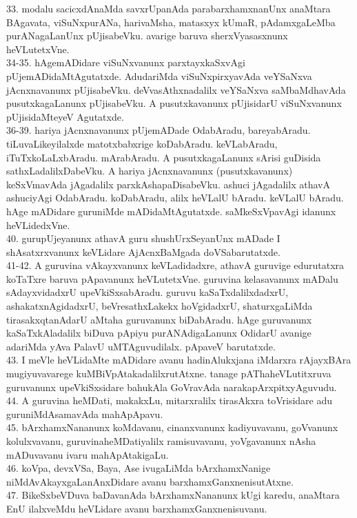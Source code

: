 \documentclass{article}
\begin{document}
33. modalu sacicxdAnaMda savxrUpanAda parabarxhamxnanUnx anaMtara BAgavata, viSuNxpurANa, harivaMsha, matasxyx kUmaR, pAdamxgaLeMba purANagaLanUnx pUjisabeVku. avarige baruva sherxVyasasxnunx heVLutetxVne.\\
34-35. hAgemADidare viSuNxvanunx parxtayxkaSxvAgi pUjemADidaMtAgutatxde. AdudariMda viSuNxpirxyavAda veYSaNxva jAcnxnavanunx pUjisabeVku. deVvasAthxnadalilx veYSaNxva saMbaMdhavAda pusutxkagaLanunx pUjisabeVku. A pusutxkavanunx pUjisidarU viSuNxvanunx pUjisidaMteyeV Agutatxde.\\
36-39. hariya jAcnxnavanunx pUjemADade OdabAradu, bareyabAradu. tiLuvaLikeyilalxde matotxbabxrige koDabAradu. keVLabAradu, iTuTxkoLaLxbAradu. mArabAradu. A pusutxkagaLanunx sArisi guDisida sathxLadalilxDabeVku. A hariya jAcnxnavanunx (pusutxkavanunx) keSxVmavAda jAgadalilx parxkAshapaDisabeVku. ashuci jAgadalilx athavA ashuciyAgi OdabAradu. koDabAradu, alilx heVLalU bAradu. keVLalU bAradu. hAge mADidare guruniMde mADidaMtAgutatxde. saMkeSxVpavAgi idanunx heVLidedxVne.\\
40. gurupUjeyanunx athavA guru shushUrxSeyanUnx mADade I shAsatxrxvanunx keVLidare AjAcnxBaMgada doVSabarutatxde.\\
41-42. A guruvina vAkayxvanunx keVLadidadxre, athavA guruvige edurutatxra koTaTxre baruva pApavanunx heVLutetxVne. guruvina kelasavanunx mADalu sAdayxvidadxrU upeVkiSxsabAradu. guruvu kaSaTxdalilxdadxrU, ashakatxnAgidadxrU, beVresathxLakekx hoVgidadxrU, shaturxgaLiMda tirasakxqtanAdarU aMtaha guruvanunx biDabAradu. hAge guruvanunx kaSaTxkAladalilx biDuva pApiyu purANAdigaLanunx OdidarU avanige adariMda yAva PalavU uMTAguvudilalx. pApaveV barutatxde.\\
43. I meVle heVLidaMte mADidare avanu hadinAlukxjana iMdarxra rAjayxBAra mugiyuvavarege kuMBiVpAtakadalilxrutAtxne. tanage pAThaheVLutitxruva guruvanunx upeVkiSxsidare bahukAla GoVravAda narakapArxpitxyAguvudu.\\
44. A guruvina heMDati, makakxLu, mitarxralilx tirasAkxra toVrisidare adu guruniMdAsamavAda mahApApavu.\\
45. bArxhamxNananunx koMdavanu, cinanxvanunx kadiyuvavanu, goVvanunx kolulxvavanu, guruvinaheMDatiyalilx ramisuvavanu, yoVgavanunx nAsha mADuvavanu ivaru mahApAtakigaLu.\\
46. koVpa, devxVSa, Baya, Ase ivugaLiMda bArxhamxNanige niMdAvAkayxgaLanAnxDidare avanu barxhamxGanxnenisutAtxne.\\
47. BikeSxbeVDuva baDavanAda bArxhamxNananunx kUgi karedu, anaMtara EnU ilalxveMdu heVLidare avanu barxhamxGanxnenisuvanu.\\
\end{document}
